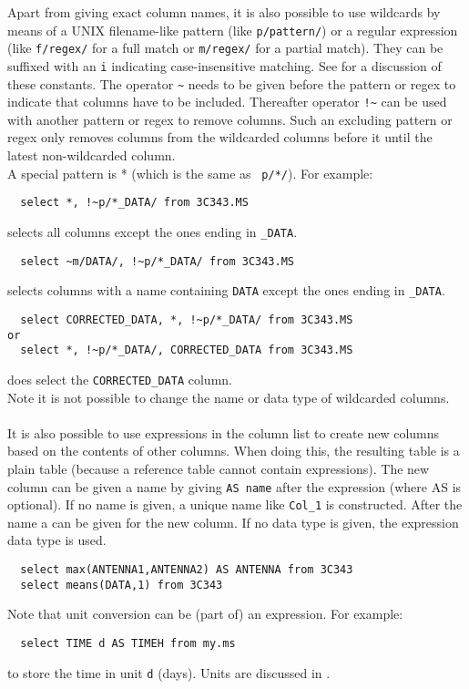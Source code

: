 Apart from giving exact column names, it is also possible to use
wildcards by means of a UNIX filename-like pattern (like \texttt{p/pattern/})
or a regular expression (like \texttt{f/regex/} for a full match or
\texttt{m/regex/} for a partial match). They can be suffixed with an
\texttt{i} indicating case-insensitive matching.
See  for a discussion of these constants.
The operator \verb+~+ needs to be given before the pattern or regex
to indicate that columns have to be included. Thereafter operator
\verb+!~+ can be used with another pattern or regex to remove columns.
Such an excluding pattern or regex only removes columns from the
wildcarded columns before it until the latest non-wildcarded column.
\\A special pattern is * (which is the same as \texttt{~p/*/}).
 For example:
\begin{verbatim}
  select *, !~p/*_DATA/ from 3C343.MS
\end{verbatim}
selects all columns except the ones ending in \texttt{\_DATA}.
\begin{verbatim}
  select ~m/DATA/, !~p/*_DATA/ from 3C343.MS
\end{verbatim}
selects columns with a name containing \texttt{DATA} except the ones
ending in \texttt{\_DATA}.
\begin{verbatim}
  select CORRECTED_DATA, *, !~p/*_DATA/ from 3C343.MS
or
  select *, !~p/*_DATA/, CORRECTED_DATA from 3C343.MS
\end{verbatim}
does select the \texttt{CORRECTED\_DATA} column.
\\Note it is not possible to change the name or data type of
wildcarded columns.

\paragraph*{}
It is also possible to use expressions in the column list to create
new columns based on the contents of other columns. When doing this,
the resulting table is a plain table (because a reference table
cannot contain expressions). The new column can be given a name
by giving \texttt{AS name} after the expression (where AS is
optional). If no name is given, a unique name like
\texttt{Col\_1} is constructed.
After the name a  can
be given for the new column. If no data type is given, the expression
data type is used.
\begin{verbatim}
  select max(ANTENNA1,ANTENNA2) AS ANTENNA from 3C343
  select means(DATA,1) from 3C343
\end{verbatim}
Note that unit conversion can be (part of) an expression. For example:
\begin{verbatim}
  select TIME d AS TIMEH from my.ms
\end{verbatim}
to store the time in unit \texttt{d} (days). Units are discussed in
.

